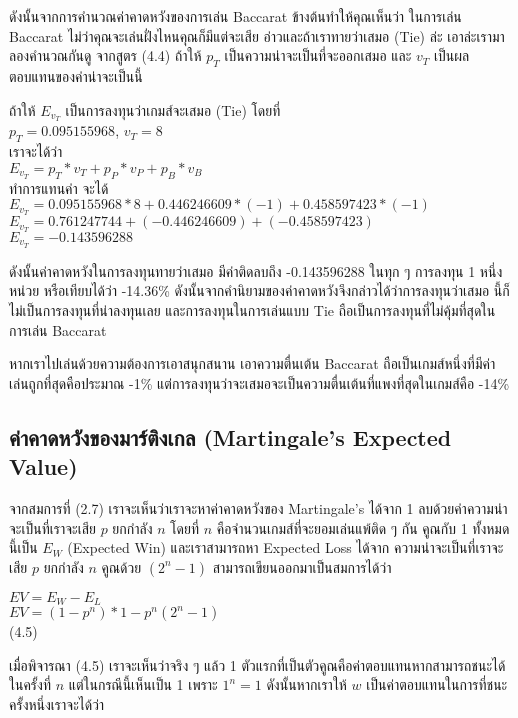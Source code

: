 \documentclass[12pt]{article}
\begin{document}
ดังนั้นจากการคำนวณค่าคาดหวังของการเล่น Baccarat ข้างต้นทำให้คุณเห็นว่า ในการเล่น Baccarat ไม่ว่าคุณจะเล่นฝั่งไหนคุณก็มีแต่จะเสีย อ่าวและถ้าเราทายว่าเสมอ (Tie) ล่ะ เอาล่ะเรามาลองคำนวณกันดู จากสูตร (4.4) ถ้าให้ $p_T$ เป็นความน่าจะเป็นที่จะออกเสมอ และ $v_T$ เป็นผลตอบแทนของค่าน่าจะเป็นนี้

\begin{center}
ถ้าให้ $E_{v_T}$ เป็นการลงทุนว่าเกมส์จะเสมอ (Tie) โดยที่\\
$p_T=0.095155968$, $v_T=8$\\
เราจะได้ว่า\\
$E_{v_T}=p_T*v_T+p_P*v_P+p_B*v_B$\\
ทำการแทนค่า จะได้\\
$E_{v_T}=0.095155968*8+0.446246609*(-1)+0.458597423*(-1)$\\
$E_{v_T}=0.761247744+(-0.446246609)+(-0.458597423)$\\
$E_{v_T}=-0.143596288$\\
\end{center}

ดังนั้นค่าคาดหวังในการลงทุนทายว่าเสมอ มีค่าติดลบถึง -0.143596288 ในทุก ๆ การลงทุน 1 หนึ่งหน่วย หรือเทียบได้ว่า -14.36\% ดังนั้นจากคำนิยามของค่าคาดหวังจึงกล่าวได้ว่าการลงทุนว่าเสมอ นี้ก็ไม่เป็นการลงทุนที่น่าลงทุนเลย และการลงทุนในการเล่นแบบ Tie ถือเป็นการลงทุนที่ไม่คุ้มที่สุดในการเล่น Baccarat 

หากเราไปเล่นด้วยความต้องการเอาสนุกสนาน เอาความตื่นเต้น Baccarat ถือเป็นเกมส์หนึ่งที่มีค่าเล่นถูกที่สุดคือประมาณ -1\%  แต่การลงทุนว่าจะเสมอจะเป็นความตื่นเต้นที่แพงที่สุดในเกมส์คือ -14\%

\subsection{ค่าคาดหวังของมาร์ติงเกล (Martingale's Expected Value)}
จากสมการที่ (2.7) เราจะเห็นว่าเราจะหาค่าคาดหวังของ Martingale's ได้จาก 1 ลบด้วยค่าความน่าจะเป็นที่เราจะเสีย $p$ ยกกำลัง $n$ โดยที่ $n$ คือจำนวนเกมส์ที่จะยอมเล่นแพ้ติด ๆ กัน คูณกับ 1 ทั้งหมดนี้เป็น $E_W$ (Expected Win) และเราสามารถหา Expected Loss ได้จาก ความน่าจะเป็นที่เราจะเสีย $p$ ยกกำลัง $n$ คูณด้วย $(2^n-1)$ สามารถเขียนออกมาเป็นสมการได้ว่า

\begin{center}
$EV=E_W-E_L$\\
$EV=(1-p^n)*1 - p^n(2^n-1)$\\
(4.5)\\
\end{center}

เมื่อพิจารณา (4.5) เราจะเห็นว่าจริง ๆ แล้ว 1 ตัวแรกที่เป็นตัวคูณคือค่าตอบแทนหากสามารถชนะได้ในครั้งที่ $n$ แต่ในกรณีนี้เห็นเป็น 1 เพราะ $1^n=1$ ดังนั้นหากเราให้ $w$ เป็นค่าตอบแทนในการที่ชนะครั้งหนึ่งเราจะได้ว่า
\end{document}
